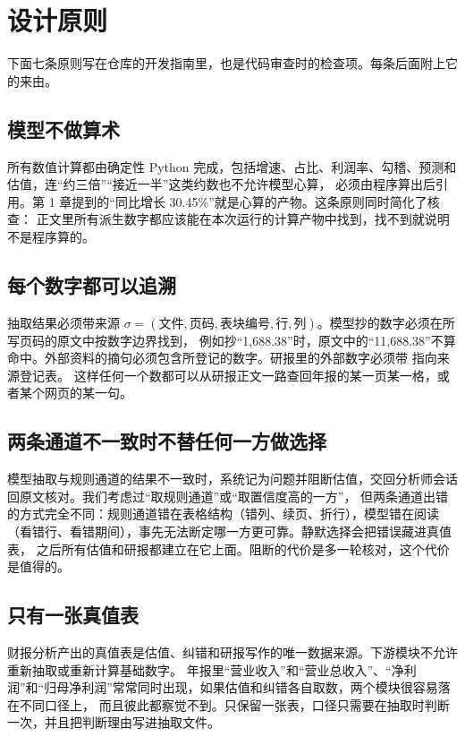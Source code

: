 \section{设计原则}

下面七条原则写在仓库的开发指南里，也是代码审查时的检查项。每条后面附上它的来由。

\subsection{模型不做算术}
所有数值计算都由确定性 Python 完成，包括增速、占比、利润率、勾稽、预测和估值，连“约三倍”“接近一半”这类约数也不允许模型心算，
必须由程序算出后引用。第 1 章提到的“同比增长 30.45\%”就是心算的产物。这条原则同时简化了核查：
正文里所有派生数字都应该能在本次运行的计算产物中找到，找不到就说明不是程序算的。

\subsection{每个数字都可以追溯}
抽取结果必须带来源 $\sigma = (\text{文件}, \text{页码}, \text{表块编号}, \text{行}, \text{列})$。模型抄的数字必须在所写页码的原文中按数字边界找到，
例如抄“1,688.38”时，原文中的“11,688.38”不算命中。外部资料的摘句必须包含所登记的数字。研报里的外部数字必须带 \code{[S编号]} 指向来源登记表。
这样任何一个数都可以从研报正文一路查回年报的某一页某一格，或者某个网页的某一句。

\subsection{两条通道不一致时不替任何一方做选择}
模型抽取与规则通道的结果不一致时，系统记为问题并阻断估值，交回分析师会话回原文核对。我们考虑过“取规则通道”或“取置信度高的一方”，
但两条通道出错的方式完全不同：规则通道错在表格结构（错列、续页、折行），模型错在阅读（看错行、看错期间），事先无法断定哪一方更可靠。静默选择会把错误藏进真值表，
之后所有估值和研报都建立在它上面。阻断的代价是多一轮核对，这个代价是值得的。

\subsection{只有一张真值表}
财报分析产出的真值表是估值、纠错和研报写作的唯一数据来源。下游模块不允许重新抽取或重新计算基础数字。
年报里“营业收入”和“营业总收入”、“净利润”和“归母净利润”常常同时出现，如果估值和纠错各自取数，两个模块很容易落在不同口径上，
而且彼此都察觉不到。只保留一张表，口径只需要在抽取时判断一次，并且把判断理由写进抽取文件。


